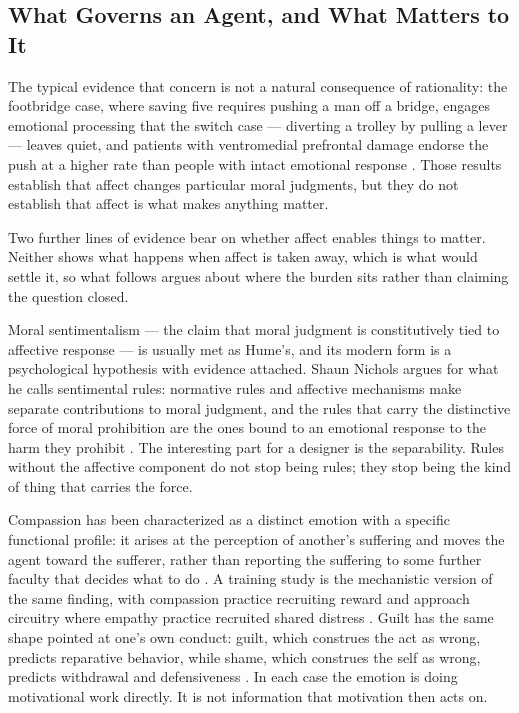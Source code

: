 \subsection{What Governs an Agent, and What Matters to It}
\label{sec:governs-matters}
The typical evidence that concern is not a natural consequence of rationality: the footbridge case, where saving five requires pushing a man off a bridge, engages emotional processing that the switch case — diverting a trolley by pulling a lever — leaves quiet, and patients with ventromedial prefrontal damage endorse the push at a higher rate than people with intact emotional response \autocite{greene2001fmri,koenigs2007damage}. Those results establish that affect changes particular moral judgments, but they do not establish that affect is what makes anything matter.

Two further lines of evidence bear on whether affect enables things to matter. Neither shows what happens when affect is taken away, which is what would settle it, so what follows argues about where the burden sits rather than claiming the question closed.

Moral sentimentalism — the claim that moral judgment is constitutively tied to affective response — is usually met as Hume's, and its modern form is a psychological hypothesis with evidence attached. Shaun Nichols argues for what he calls sentimental rules: normative rules and affective mechanisms make separate contributions to moral judgment, and the rules that carry the distinctive force of moral prohibition are the ones bound to an emotional response to the harm they prohibit \autocite{nichols2004sentimental}. The interesting part for a designer is the separability. Rules without the affective component do not stop being rules; they stop being the kind of thing that carries the force.

Compassion has been characterized as a distinct emotion with a specific functional profile: it arises at the perception of another's suffering and moves the agent toward the sufferer, rather than reporting the suffering to some further faculty that decides what to do \autocite{goetz2010compassion}. A training study is the mechanistic version of the same finding, with compassion practice recruiting reward and approach circuitry where empathy practice recruited shared distress \autocite{klimecki2013differential}. Guilt has the same shape pointed at one's own conduct: guilt, which construes the act as wrong, predicts reparative behavior, while shame, which construes the self as wrong, predicts withdrawal and defensiveness \autocite{tangney2007moral}. In each case the emotion is doing motivational work directly. It is not information that motivation then acts on.

